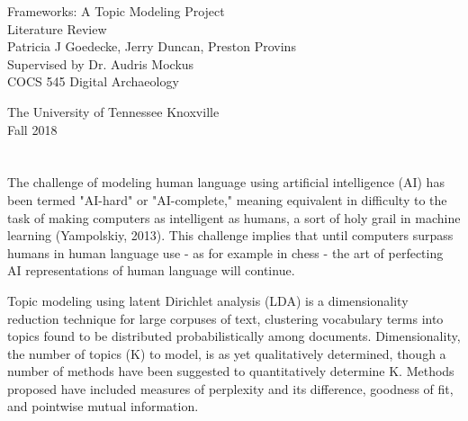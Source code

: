 \documentclass[11pt]{article}
\begin{document}
\begin{titlepage}
\thispagestyle{empty}
\begin{center}
\vspace*{2.54cm}

Frameworks: A Topic Modeling Project\\
\vspace{0.25cm}
Literature Review\\
\vspace{0.5 cm}
Patricia J Goedecke, Jerry Duncan, Preston Provins\\
\vspace{.25cm}
Supervised by Dr. Audris Mockus\\
\vspace{2.0cm}
COCS 545 Digital Archaeology
\normalsize

\vfill

The University of Tennessee Knoxville\\
Fall 2018
\end{center}
\end{titlepage}
\setcounter{page}{2}



\newpage %
\pagestyle{plain}

\section*{}
The challenge of modeling human language using artificial intelligence (AI) has been termed "AI-hard" or "AI-complete," meaning equivalent in difficulty to the task of making computers as intelligent as humans, a sort of holy grail in machine learning (Yampolskiy, 2013). This challenge implies that until computers surpass humans in human language use - as for example in chess - the art of perfecting AI representations of human language will continue.

Topic modeling using latent Dirichlet analysis (LDA) is a dimensionality reduction technique for large corpuses of text, clustering vocabulary terms into topics found to be distributed probabilistically among documents. Dimensionality, the number of topics (K) to model, is as yet qualitatively determined, though a number of methods have been suggested to quantitatively determine K. Methods proposed have included measures of perplexity and its difference, goodness of fit, and pointwise mutual information. 
\end{document}
